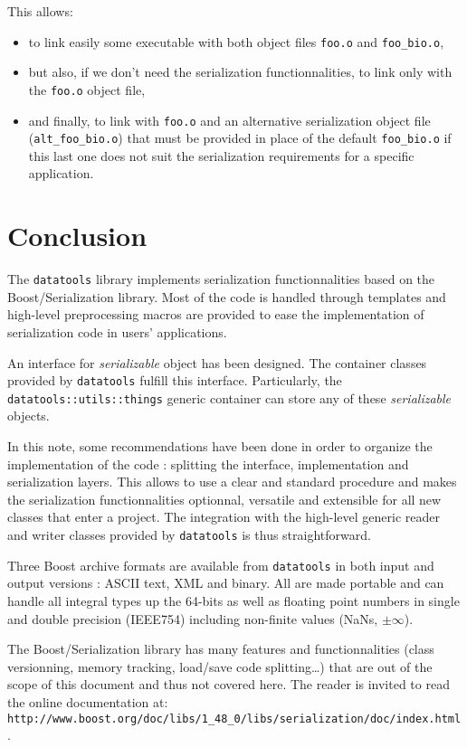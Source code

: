 \documentclass[a4paper,12pt]{article}
\newcommand{\pn}{\par\noindent}
\begin{document}
\pn This allows:
\begin{itemize} 

\item to link easily some executable with both object files 
 \texttt{foo.o} and \texttt{foo\_bio.o},

\item but also, if we  don't need the serialization functionnalities, to
  link only with the \texttt{foo.o} object file,

\item  and finally,  to link  with \texttt{foo.o}  and  an alternative
  serialization  object file  (\texttt{alt\_foo\_bio.o}) that  must be
  provided in  place of the  default \texttt{foo\_bio.o} if  this last
  one  does not  suit the  serialization requirements  for  a specific
  application.
\end{itemize}

\clearpage

\section{Conclusion}

The     \texttt{datatools}     library    implements     serialization
functionnalities based on the Boost/Se\-rialization library. Most of the
code is handled through  templates and high-level preprocessing macros
are  provided to  ease  the implementation  of  serialization code  in
users' applications.

An  interface for  \emph{serializable} object  has been  designed. The
container   classes  provided   by  \texttt{datatools}   fulfill  this
interface. Particularly, the \texttt{datatools::utils::things} generic
container can store any of these \emph{serializable} objects.

In this note, some recommendations have been done in order to organize
the   implementation  of   the   code  :   splitting  the   interface,
implementation and  serialization layers.  This allows to  use a clear
and  standard procedure and  makes the  serialization functionnalities
optionnal, versatile and  extensible for all new classes  that enter a
project.   The  integration with  the  high-level  generic reader  and
writer classes provided by \texttt{datatools} is thus straightforward.

Three Boost  archive formats  are available from  \texttt{datatools} 
in both input and output versions :
ASCII text, XML  and binary. All are made portable  and can handle all
integral types  up the  64-bits as well  as floating point  numbers in
single  and  double precision  (IEEE754)  including non-finite  values
(NaNs, $\pm\infty$).


The Boost/Serialization library has many features and functionnalities
(class  versionning, memory  tracking,  load/save code  splitting\dots)
that  are out  of the  scope  of this  document and  thus not  covered
here.  The  reader  is   invited  to  read  the  online  do\-cumentation
at:\\ \texttt{http://www.boost.org/doc/libs/1\_48\_0/libs/serialization/doc/index.html}.
\end{document}
